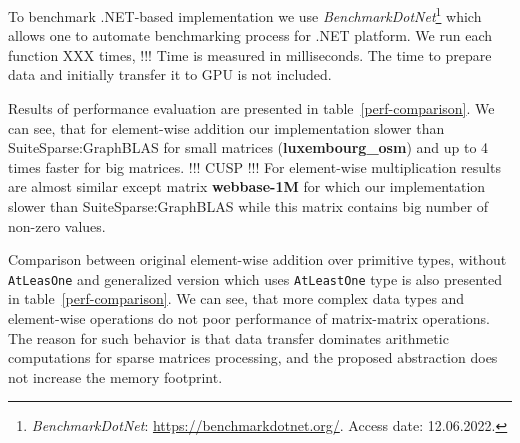 To benchmark .NET-based implementation we use \textit{BenchmarkDotNet}\footnote{\textit{BenchmarkDotNet}: \url{https://benchmarkdotnet.org/}. Access date: 12.06.2022.} which allows one to automate benchmarking process for .NET platform.
We run each function XXX times, !!!
Time is measured in milliseconds. The time to prepare data and initially transfer it to GPU is not included.

Results of performance evaluation are presented in table~\ref{perf-comparison}.
We can see, that for element-wise addition our implementation slower than SuiteSparse:GraphBLAS for small matrices (\textbf{luxembourg\_osm}) and up to 4 times faster for big matrices. !!! CUSP !!!
For element-wise multiplication results are almost similar except matrix \textbf{webbase-1M} for which our implementation slower than SuiteSparse:GraphBLAS while this matrix contains big number of non-zero values.

Comparison between original element-wise addition over primitive types, without \texttt{AtLeasOne} and generalized version which uses \texttt{AtLeastOne} type is also presented in table~\ref{perf-comparison}.
We can see, that more complex data types and element-wise operations do not poor performance of matrix-matrix operations. The reason for such behavior is that data transfer dominates arithmetic computations for sparse matrices processing, and the proposed abstraction does not increase the memory footprint.
